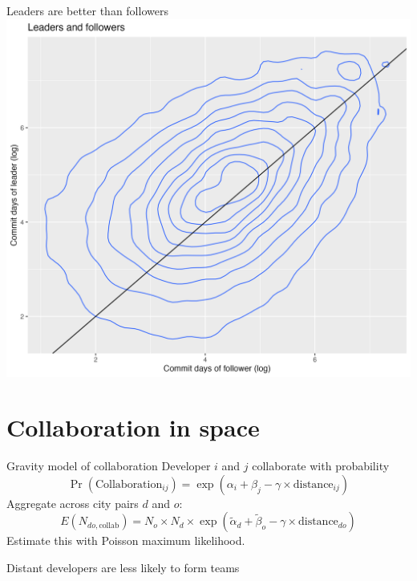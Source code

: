 \documentclass[
  ignorenonframetext,
  aspectratio=169,
]{beamer}
\begin{document}
\begin{frame}{Leaders are better than followers}
\protect\hypertarget{leaders-are-better-than-followers}{}
\includegraphics{figures/quality_scatter.png}
\end{frame}

\section{Collaboration in space}\label{collaboration-in-space}

\begin{frame}{Gravity model of collaboration}
\protect\hypertarget{gravity-model-of-collaboration}{}
Developer \(i\) and \(j\) collaborate with probability \[
\Pr(\text{Collaboration}_{ij}) = \exp(\alpha_i + \beta_j -\gamma\times\text{distance}_{ij})
\] Aggregate across city pairs \(d\) and \(o\): \[
E(N_{do,\text{collab}}) = N_o\times N_d\times\exp(\tilde\alpha_d + \tilde\beta_o -\gamma\times\text{distance}_{do})
\] Estimate this with Poisson maximum likelihood.
\end{frame}

\begin{frame}{Distant developers are less likely to form teams}
\protect\hypertarget{distant-developers-are-less-likely-to-form-teams}{}
\vspace*{-2ex}\hspace*{-2em}
\end{frame}
\end{document}

